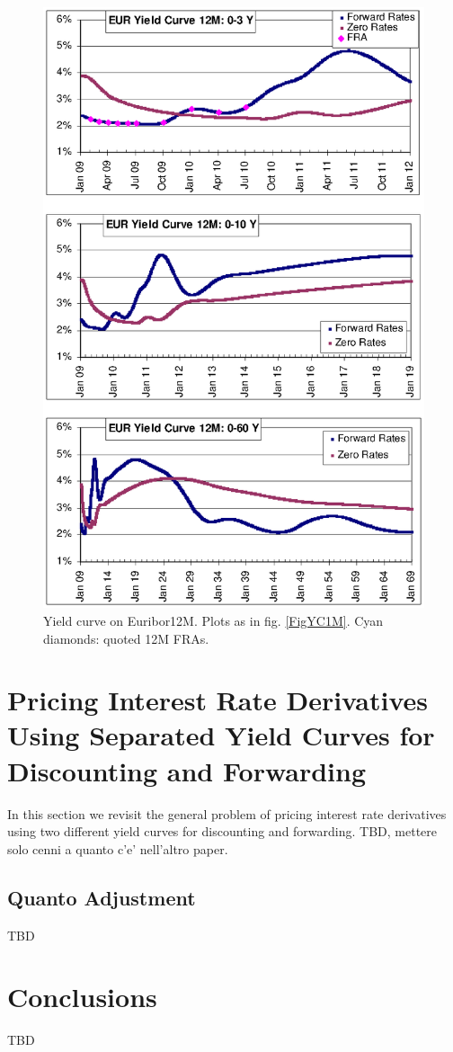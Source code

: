 \documentclass[11pt,reqno]{amsart}
\begin{document}
\begin{figure}[tbp]
\centering
\includegraphics[scale=0.9]{./FigYC12M}
\caption{Yield curve on Euribor12M. Plots as in fig. \protect\ref{FigYC1M}. Cyan diamonds: quoted 12M FRAs.}
\label{FigYC12M}
\end{figure}

\section{\label{SecPricing2curves}Pricing Interest Rate Derivatives Using Separated Yield Curves for
Discounting and Forwarding}
In this section we revisit the general problem of pricing interest rate derivatives using two different yield curves for discounting and forwarding.
TBD, mettere solo cenni a quanto c'e' nell'altro paper.


\subsection{Quanto Adjustment}
TBD


\section{\label{SecConclusions}Conclusions}

TBD




\end{document}
